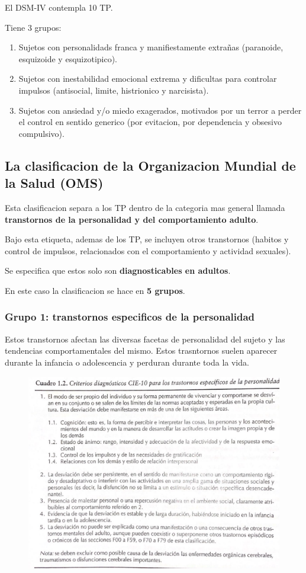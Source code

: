 \documentclass[12pt,a4paper]{article}
\begin{document}
El DSM-IV contempla 10 TP.

Tiene 3 grupos:

\begin{enumerate}
	\item Sujetos con personalidads franca y manifiestamente extrañas (paranoide, esquizoide y esquizotipico).
	\item Sujetos con inestabilidad emocional extrema y dificultas para controlar impulsos (antisocial, limite, histrionico y narcisista).
	\item Sujetos con ansiedad y/o miedo exagerados, motivados por un terror a perder el control en sentido generico  (por evitacion, por dependencia y obsesivo compulsivo).
\end{enumerate}

\subsection{La clasificacion de la Organizacion Mundial de la Salud (OMS)}

Esta clasificacion separa a los TP dentro de la categoria mas general llamada \textbf{transtornos de la personalidad y del comportamiento adulto}. 

Bajo esta etiqueta, ademas de los TP, se incluyen otros transtornos (habitos y control de impulsos, relacionados con el comportamiento y actividad sexuales). 

Se especifica que estos solo son \textbf{diagnosticables en adultos}. 

En este caso la clasificacion se hace en \textbf{5 grupos}. 

\subsubsection{Grupo 1: transtornos especificos de la personalidad}

Estos transtornos afectan las diversas facetas de personalidad del sujeto y las tendencias comportamentales del mismo. Estos trasntornos suelen aparecer durante la infancia o adolescencia y perduran durante toda la vida.

\begin{figure}[htpb]
	\centering
	\includegraphics[width=0.7\linewidth]{hola1.png}
	\label{fig:hola1}
\end{figure}
\end{document}

